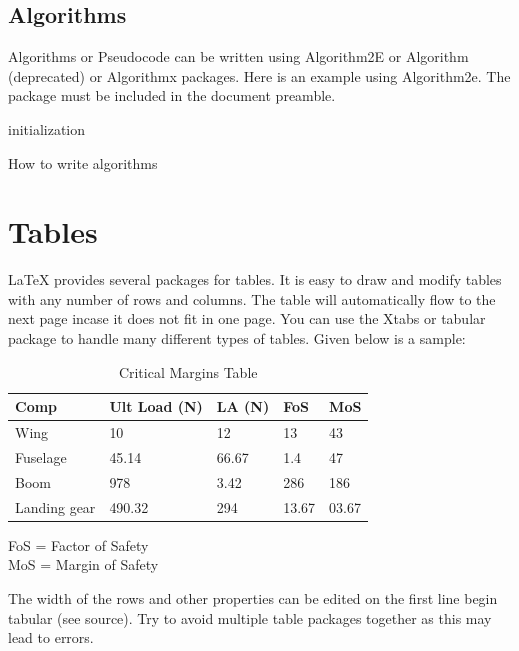 \documentclass[ 12pt,a4paper,twocolumn,fleqn]{article}
\begin{document}
\subsection{Algorithms}
Algorithms or Pseudocode can be written using Algorithm2E or Algorithm (deprecated) or Algorithmx packages. Here is an example using Algorithm2e. The package must be included in the document preamble.
\begin{algorithm}[H]
 initialization\;
 \caption{How to write algorithms}
\end{algorithm}
\section{Tables}
\LaTeX{} provides several packages for tables. It is easy to draw and modify tables with any number of rows and columns. The table will automatically flow to the next page incase it does not fit in one page. You can use the Xtabs or tabular package to handle many different types of tables. Given below is a sample:
\begin{table}[H]
\centering
\footnotesize
\begin{tabular}{|p{2cm}| p{2cm} |p{2cm}|p{2cm}|p{2cm}|}
\hline
Comp & Ult Load (N) & LA (N) & FoS & MoS\\
\hline\hline
Wing & 10 & 12 & 13 & 43\\
Fuselage & 45.14 & 66.67 & 1.4 & 47\\
Boom & 978 & 3.42 & 286 & 186\\
Landing gear & 490.32 & 294 & 13.67& 03.67\\
\hline
\end{tabular}
\caption{Critical Margins Table}
\label{table:10}
FoS = Factor of Safety \\
MoS = Margin of Safety \\
\end{table}
The width of the rows and other properties can be edited on the first line begin tabular (see source). Try to avoid multiple table packages together as this may lead to errors.
\newpage
  \pagestyle{fancy}
\thisfancypage{%
  \setlength{\fboxsep}{20pt}\doublebox}{}
\end{document}
